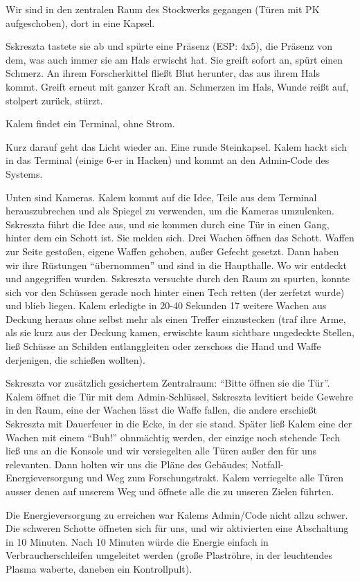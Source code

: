 \documentclass[11pt]{article}
\begin{document}
Wir sind in den zentralen Raum des Stockwerks gegangen (Türen mit PK
aufgeschoben), dort in eine Kapsel.

Sskreszta tastete sie ab und spürte eine Präsenz (ESP: 4x5), die Präsenz
von dem, was auch immer sie am Hals erwischt hat. Sie greift sofort an,
spürt einen Schmerz. An ihrem Forscherkittel fließt Blut herunter, das
aus ihrem Hals kommt. Greift erneut mit ganzer Kraft an. Schmerzen im
Hals, Wunde reißt auf, stolpert zurück, stürzt.

Kalem findet ein Terminal, ohne Strom.

Kurz darauf geht das Licht wieder an. Eine runde Steinkapsel. Kalem
hackt sich in das Terminal (einige 6-er in Hacken) und kommt an den
Admin-Code des Systems.

Unten sind Kameras. Kalem kommt auf die Idee, Teile aus dem Terminal
herauszubrechen und als Spiegel zu verwenden, um die Kameras umzulenken.
Sskreszta führt die Idee aus, und sie kommen durch eine Tür in einen
Gang, hinter dem ein Schott ist. Sie melden sich. Drei Wachen öffnen das
Schott. Waffen zur Seite gestoßen, eigene Waffen gehoben, außer Gefecht
gesetzt. Dann haben wir ihre Rüstungen ``übernommen'' und sind in die
Haupthalle. Wo wir entdeckt und angegriffen wurden. Sskreszta versuchte
durch den Raum zu spurten, konnte sich vor den Schüssen gerade noch
hinter einen Tech retten (der zerfetzt wurde) und blieb liegen. Kalem
erledigte in 20-40 Sekunden 17 weitere Wachen aus Deckung heraus ohne
selbst mehr als einen Treffer einzustecken (traf ihre Arme, als sie kurz
aus der Deckung kamen, erwischte kaum sichtbare ungedeckte Stellen, ließ
Schüsse an Schilden entlanggleiten oder zerschoss die Hand und Waffe
derjenigen, die schießen wollten).

Sskreszta vor zusätzlich gesichertem Zentralraum: ``Bitte öffnen sie die
Tür''. Kalem öffnet die Tür mit dem Admin-Schlüssel, Sskreszta levitiert
beide Gewehre in den Raum, eine der Wachen lässt die Waffe fallen, die
andere erschießt Sskreszta mit Dauerfeuer in die Ecke, in der sie stand.
Später ließ Kalem eine der Wachen mit einem ``Buh!'' ohnmächtig werden,
der einzige noch stehende Tech ließ uns an die Konsole und wir
versiegelten alle Türen außer den für uns relevanten. Dann holten wir
uns die Pläne des Gebäudes; Notfall-Energieversorgung und Weg zum
Forschungstrakt. Kalem verriegelte alle Türen ausser denen auf unserem
Weg und öffnete alle die zu unseren Zielen führten.

Die Energieversorgung zu erreichen war Kalems Admin/Code nicht allzu
schwer. Die schweren Schotte öffneten sich für uns, und wir aktivierten
eine Abschaltung in 10 Minuten. Nach 10 Minuten würde die Energie
einfach in Verbraucherschleifen umgeleitet werden (große Plaströhre, in
der leuchtendes Plasma waberte, daneben ein Kontrollpult).
\end{document}
